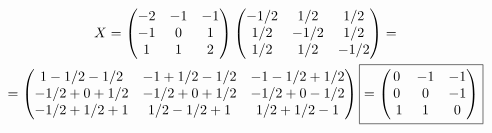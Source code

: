 \documentclass{article}
\theoremstyle{definition}
\theoremstyle{plain}
\begin{document}
\begin{multline*}
  X =
  \begin{pmatrix}
    -2 & -1 & -1\\
    -1 & 0 & 1\\
    1 & 1 & 2
  \end{pmatrix}
  \begin{pmatrix}
    -1/2 & 1/2 & 1/2\\
    1/2 & -1/2 & 1/2\\
    1/2 & 1/2 & -1/2
  \end{pmatrix}
  =\\
  =
  \begin{pmatrix}
    1 - 1/2 - 1/2 & -1 + 1/2 - 1/2 & -1 - 1/2 + 1/2\\
    -1/2 + 0 + 1/2 & -1/2 + 0 + 1/2 & -1/2 + 0 - 1/2\\
    -1/2 + 1/2 + 1 & 1/2 - 1/2 + 1 & 1/2 + 1/2 - 1
  \end{pmatrix}
  \fbox{$=
    \begin{pmatrix} 0 & -1 & -1\\
      0 & 0 & -1\\\
      1 & 1 & 0
    \end{pmatrix}$}
\end{multline*}
\end{document}
